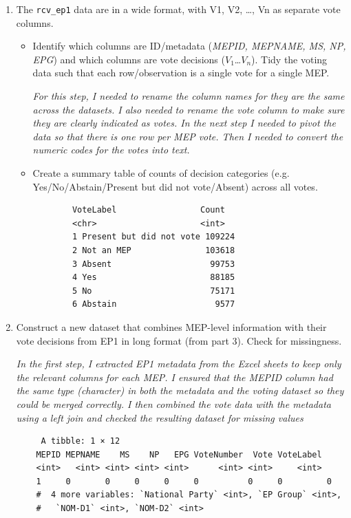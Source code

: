 \documentclass[12pt,letterpaper]{article}
\begin{document}
\begin{enumerate}
\item The \texttt{rcv\_ep1} data are in a wide format, with V1, V2, …, Vn as separate vote columns.
\begin{itemize}
	\item Identify which columns are ID/metadata (\textit{MEPID, MEPNAME, MS, NP, EPG}) and which columns are vote decisions ($V_1$…$V_n$). Tidy the voting data such that each row/observation is a single vote for a single MEP.
	 
	\textit {For this step, I needed to rename the column names for they are the same across the datasets. I also needed to rename the vote column to make sure they are clearly indicated as votes. In the next step I needed to pivot the data so that there is one row per MEP vote. Then I needed to convert the numeric codes for the votes into text.} 
	\item Create a summary table of counts of decision categories (e.g. Yes/No/Abstain/Present but did not vote/Absent) across all votes.
	 
	\begin{verbatim}
		VoteLabel                 Count
		<chr>                     <int>
		1 Present but did not vote 109224
		2 Not an MEP               103618
		3 Absent                    99753
		4 Yes                       88185
		5 No                        75171
		6 Abstain                    9577
	\end{verbatim}
\end{itemize}
\item  Construct a new dataset that combines MEP-level information with their vote decisions from EP1 in long format (from part 3). Check for missingness.

\textit {In the first step, I extracted EP1 metadata from the Excel sheets to keep only the relevant columns for each MEP. I ensured that the MEPID column had the same type (character) in both the metadata and the voting dataset so they could be merged correctly. I then combined the vote data with the metadata using a left join and checked the resulting dataset for missing values}
\begin{verbatim}
	 A tibble: 1 × 12
	MEPID MEPNAME    MS    NP   EPG VoteNumber  Vote VoteLabel
	<int>   <int> <int> <int> <int>      <int> <int>     <int>
	1     0       0     0     0     0          0     0         0
	#  4 more variables: `National Party` <int>, `EP Group` <int>,
	#   `NOM-D1` <int>, `NOM-D2` <int>
		\end{verbatim} 

\end{enumerate}
\end{document}
